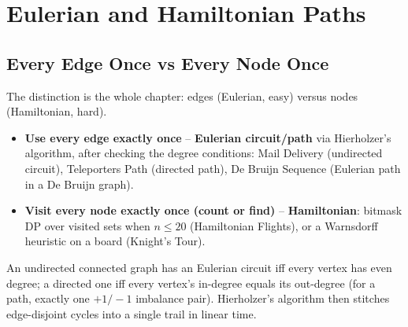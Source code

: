 \chapter{Eulerian and Hamiltonian Paths}

\section{Every Edge Once vs Every Node Once}
\label{sec:cses-graph-euler-intro}

The distinction is the whole chapter: edges (Eulerian, easy) versus nodes
(Hamiltonian, hard).

\begin{patternbox}
\begin{itemize}
  \item \textbf{Use every edge exactly once} -- \textbf{Eulerian
        circuit/path} via Hierholzer's algorithm, after checking the
        degree conditions: Mail Delivery (undirected circuit),
        Teleporters Path (directed path), De Bruijn Sequence (Eulerian
        path in a De Bruijn graph).
  \item \textbf{Visit every node exactly once (count or find)} --
        \textbf{Hamiltonian}: bitmask DP over visited sets when $n\le20$
        (Hamiltonian Flights), or a Warnsdorff heuristic on a board
        (Knight's Tour).
  \end{itemize}
\end{patternbox}

\begin{ideabox}
An undirected connected graph has an Eulerian circuit iff every vertex has
even degree; a directed one iff every vertex's in-degree equals its
out-degree (for a path, exactly one $+1/-1$ imbalance pair). Hierholzer's
algorithm then stitches edge-disjoint cycles into a single trail in linear
time.
\end{ideabox}

\newpage







